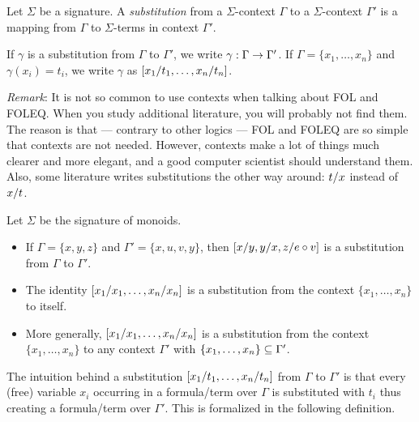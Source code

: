 \begin{definition}[Substitution]\label{def:fol:sub}
Let $\Sigma$ be a signature. A \emph{substitution} from a $\Sigma$-context $\Gamma$ to a $\Sigma$-context $\Gamma'$ is a mapping from $\Gamma$ to $\Sigma$-terms in context $\Gamma'$.
\end{definition}

\begin{notation}
If $\gamma$ is a substitution from $\Gamma$ to $\Gamma'$, we write $\gamma:\Gamma\rightarrow\Gamma'$.
If $\Gamma=\{x_1,\ldots,x_n\}$ and $\gamma(x_i)=t_i$, we write $\gamma$ as $[x_1/t_1,\ldots,x_n/t_n]$.
\end{notation}

\emph{Remark}: It is not so common to use contexts when talking about FOL and FOLEQ. When you study additional literature, you will probably not find them. The reason is that --- contrary to other logics --- FOL and FOLEQ are so simple that contexts are not needed. However, contexts make a lot of things much clearer and more elegant, and a good computer scientist should understand them. Also, some literature writes substitutions the other way around: $t/x$ instead of $x/t$.

\begin{example}\label{ex:fol:sub}
Let $\Sigma$ be the signature of monoids.
\begin{itemize}
\item If $\Gamma=\{x,y,z\}$ and $\Gamma'=\{x,u,v,y\}$, then $[x/y,y/x,z/e\circ v]$ is a substitution from $\Gamma$ to $\Gamma'$.
\item The identity $[x_1/x_1,\ldots,x_n/x_n]$ is a substitution from the context $\{x_1,\ldots,x_n\}$ to itself.
\item More generally, $[x_1/x_1,\ldots,x_n/x_n]$ is a substitution from the context $\{x_1,\ldots,x_n\}$ to any context $\Gamma'$ with $\{x_1,\ldots,x_n\}\subseteq\Gamma'$.
\end{itemize}
\end{example}

The intuition behind a substitution $[x_1/t_1,\ldots,x_n/t_n]$ from $\Gamma$ to $\Gamma'$ is that every (free) variable $x_i$ occurring in a formula/term over $\Gamma$ is substituted with $t_i$ thus creating a formula/term over $\Gamma'$. This is formalized in the following definition.


